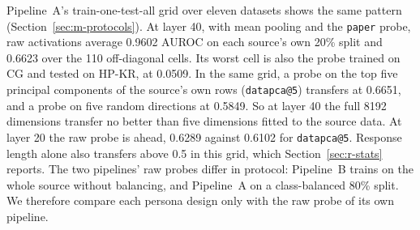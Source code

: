 Pipeline~A's train-one-test-all grid over eleven datasets shows the same pattern (Section~\ref{sec:m-protocols}). %
At layer 40, with mean pooling and the \texttt{paper} probe, raw activations average 0.9602 AUROC on each source's own 20\% split and 0.6623 over the 110 off-diagonal cells. %
Its worst cell is also the probe trained on CG and tested on HP-KR, at 0.0509. %
In the same grid, a probe on the top five principal components of the source's own rows (\texttt{datapca@5}) transfers at 0.6651, and a probe on five random directions at 0.5849. %
So at layer 40 the full 8192 dimensions transfer no better than five dimensions fitted to the source data. %
At layer 20 the raw probe is ahead, 0.6289 against 0.6102 for \texttt{datapca@5}. %
Response length alone also transfers above 0.5 in this grid, which Section~\ref{sec:r-stats} reports. %
The two pipelines' raw probes differ in protocol: Pipeline~B trains on the whole source without balancing, and Pipeline~A on a class-balanced 80\% split. %
We therefore compare each persona design only with the raw probe of its own pipeline.

